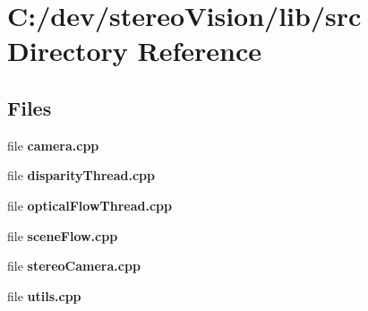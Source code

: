 \section{C\+:/dev/stereo\+Vision/lib/src Directory Reference}
\label{dir_a065c5f60305fee3569f887679366939}
\subsection*{Files}
\begin{DoxyCompactItemize}
\item 
file {\bfseries camera.\+cpp}
\item 
file {\bfseries disparity\+Thread.\+cpp}
\item 
file {\bfseries optical\+Flow\+Thread.\+cpp}
\item 
file {\bfseries scene\+Flow.\+cpp}
\item 
file {\bfseries stereo\+Camera.\+cpp}
\item 
file {\bfseries utils.\+cpp}
\end{DoxyCompactItemize}
